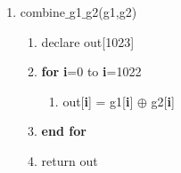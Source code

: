 \documentclass[journal,10pt,onecolumn]{article}
\begin{document}
\begin{enumerate}
\begin{enumerate}
    \item combine$\_$g1$\_$g2(g1,g2)
    \begin{enumerate}
        \item[] declare out[1023]
        \item[] \textbf{for} \textbf{i}=0 to \textbf{i}=1022
        \begin{enumerate}
            \item[] out[\textbf{i}] = g1[\textbf{i}] $\oplus$ g2[\textbf{i}]
        \end{enumerate}
        \item[]  \textbf{end for}
        \item[]  return out
    \end{enumerate}
    


\end{enumerate}
\end{enumerate}
\end{document}
